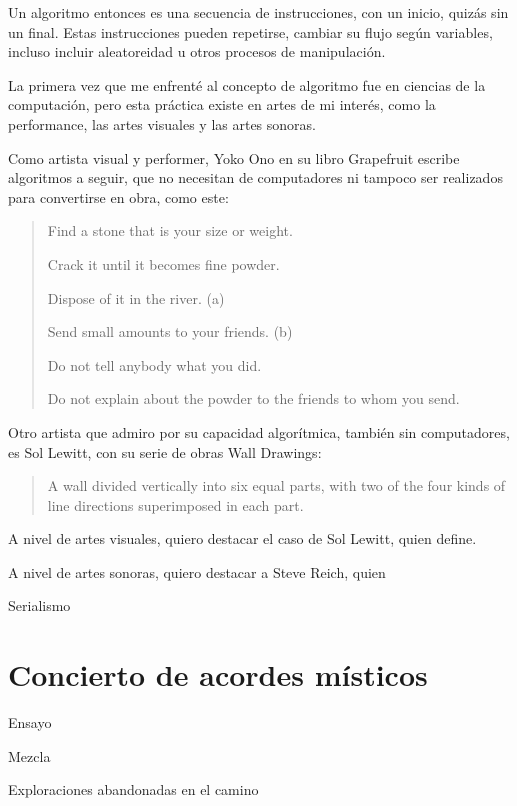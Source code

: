 \documentclass{article}
\begin{document}
Un algoritmo entonces es una secuencia de instrucciones, con un inicio, quizás sin un final. Estas instrucciones pueden repetirse, cambiar su flujo según variables, incluso incluir aleatoreidad u otros procesos de manipulación.

La primera vez que me enfrenté al concepto de algoritmo fue en ciencias de la computación, pero esta práctica existe en artes de mi interés, como la performance, las artes visuales y las artes sonoras.

Como artista visual y performer, Yoko Ono en su libro Grapefruit escribe algoritmos a seguir, que no necesitan de computadores ni tampoco ser realizados para convertirse en obra, como este:

\begin{quote}
  Find a stone that is your size or weight.
  
  Crack it until it becomes fine powder.
  
  Dispose of it in the river. (a)

  Send small amounts to your friends. (b)

  Do not tell anybody what you did.

  Do not explain about the powder to the friends to whom you send.\cite{grapefruitYokoOno}
\end{quote}

Otro artista que admiro por su capacidad algorítmica, también sin computadores, es Sol Lewitt, con su serie de obras Wall Drawings:

\begin{quote}
    A wall divided vertically into six equal parts, with two of the four kinds of line directions superimposed in each part.
\end{quote}

A nivel de artes visuales, quiero destacar el caso de Sol Lewitt, quien define. 



A nivel de artes sonoras, quiero destacar a Steve Reich, quien 

Serialismo

\clearpage

\section{Concierto de acordes místicos}

Ensayo

Mezcla

Exploraciones abandonadas en el camino
\end{document}
